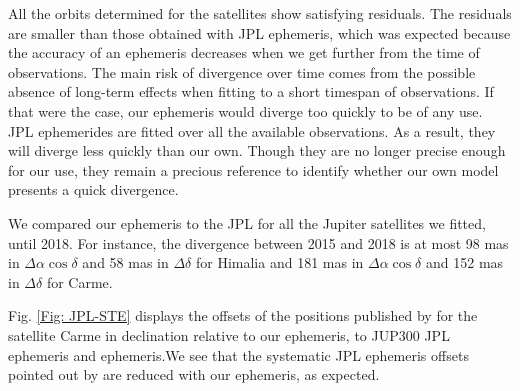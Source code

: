 
All the orbits determined for the satellites show satisfying residuals. %
The residuals are smaller than those obtained with JPL ephemeris, which was expected because the accuracy of an ephemeris decreases when we get further from the time of observations. The main risk of divergence over time comes from the possible absence of long-term effects when fitting to a short timespan of observations. If that were the case, our ephemeris would diverge too quickly to be of any use. JPL ephemerides are fitted over all the available observations. As a result, they will diverge less quickly than our own. Though they are no longer precise enough for our use, they remain a precious reference to identify whether our own model presents a quick divergence.

We compared our ephemeris to the JPL for all the Jupiter satellites we fitted, until 2018. For instance, the divergence between 2015 and 2018 is at most 98 mas in $\Delta \alpha \cos \delta$ and 58 mas in $\Delta \delta$ for Himalia and 181 mas in $\Delta \alpha \cos \delta$ and 152 mas in $\Delta \delta$ for Carme.

Fig. \ref{Fig: JPL-STE} displays the offsets of the positions published by \cite{GomesJunior2015} for the satellite Carme in declination relative to our ephemeris, to \cite{Jacobson2012} JUP300 JPL ephemeris and \cite{Emelyanov2008} ephemeris.We see that the systematic JPL ephemeris offsets pointed out by \cite{GomesJunior2015} are reduced with our ephemeris, as expected.

